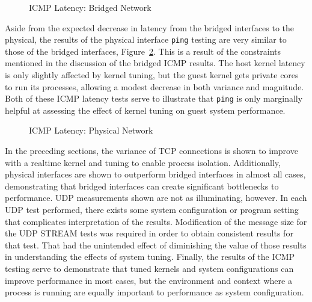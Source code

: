\begin{figure}
    \centering
    \def\svgwidth{\columnwidth}
    
    \caption{ICMP Latency: Bridged Network}
    \label{fig:icmplatencybridge}
\end{figure}
Aside from the expected decrease in latency from the bridged interfaces to the physical, the results of the physical interface \texttt{ping} testing are very similar to those of the bridged interfaces, Figure~\ref{fig:icmplatencyphys}.  
This is a result of the constraints mentioned in the discussion of the bridged ICMP results.
The host kernel latency is only slightly affected by kernel tuning, but the guest kernel gets private cores to run its processes, allowing a modest decrease in both variance and magnitude.  
Both of these ICMP latency tests serve to illustrate that \texttt{ping} is only marginally helpful at assessing the effect of kernel tuning on guest system performance.  

\begin{figure}
    \centering
    \def\svgwidth{\columnwidth}
    
    \caption{ICMP Latency: Physical Network}
    \label{fig:icmplatencyphys}
\end{figure}


In the preceding sections, the variance of TCP connections is shown to improve with a realtime kernel and tuning to enable process isolation.
Additionally, physical interfaces are shown to outperform bridged interfaces in almost all cases, demonstrating that bridged interfaces can create significant bottlenecks to performance.
UDP measurements shown are not as illuminating, however.  
In each UDP test performed, there exists some system configuration or program setting that complicates interpretation of the results.
Modification of the message size for the UDP STREAM tests was required in order to obtain consistent results for that test.  
That had the unintended effect of diminishing the value of those results in understanding the effects of system tuning.
Finally, the results of the ICMP testing serve to demonstrate that tuned kernels and system configurations can improve performance in most cases, but the environment and context where a process is running are equally important to performance as system configuration.


